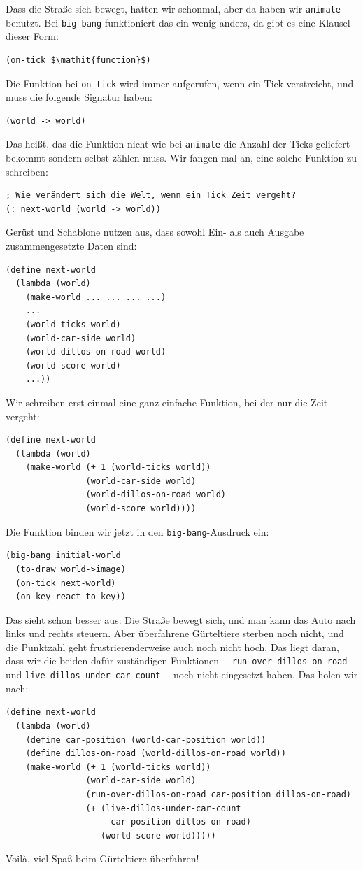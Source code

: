 Dass die Straße sich bewegt, hatten wir schonmal, aber da haben wir
\lstinline{animate} benutzt.  Bei \lstinline{big-bang} funktioniert
das ein wenig anders, da gibt es eine Klausel dieser Form:
%
\begin{lstlisting}
(on-tick $\mathit{function}$)
\end{lstlisting}
%
Die Funktion bei \lstinline{on-tick} wird immer aufgerufen, wenn ein
Tick verstreicht, und muss die folgende Signatur haben:
%
\begin{lstlisting}
(world -> world)
\end{lstlisting}
%
Das heißt, das die Funktion nicht wie bei \lstinline{animate} die
Anzahl der Ticks geliefert bekommt sondern selbst zählen muss.  Wir
fangen mal an, eine solche Funktion zu schreiben:
%
\begin{lstlisting}
; Wie verändert sich die Welt, wenn ein Tick Zeit vergeht?
(: next-world (world -> world))
\end{lstlisting}
%
Gerüst und Schablone nutzen aus, dass sowohl Ein- als auch Ausgabe
zusammengesetzte Daten sind:
%
\begin{lstlisting}
(define next-world
  (lambda (world)
    (make-world ... ... ... ...)
    ...
    (world-ticks world)
    (world-car-side world)
    (world-dillos-on-road world)
    (world-score world)
    ...))
\end{lstlisting}
%
Wir schreiben erst einmal eine ganz einfache Funktion, bei der nur die
Zeit vergeht:
%
\begin{lstlisting}
(define next-world
  (lambda (world)
    (make-world (+ 1 (world-ticks world))
                (world-car-side world)
                (world-dillos-on-road world)
                (world-score world))))
\end{lstlisting}
%
Die Funktion binden wir jetzt in den \lstinline{big-bang}-Ausdruck ein:
%
\begin{lstlisting}
(big-bang initial-world
  (to-draw world->image)
  (on-tick next-world)
  (on-key react-to-key))
\end{lstlisting}
%
Das sieht schon besser aus: Die Straße bewegt sich, und man kann das
Auto nach links und rechts steuern.  Aber überfahrene Gürteltiere
sterben noch nicht, und die Punktzahl geht frustrierenderweise auch
noch nicht hoch.  Das liegt daran, dass wir die beiden dafür zuständigen Funktionen~--
\lstinline{run-over-dillos-on-road} und
\lstinline{live-dillos-under-car-count}~-- noch nicht eingesetzt
haben.  Das holen wir nach:
%
\begin{lstlisting}
(define next-world
  (lambda (world)
    (define car-position (world-car-position world))
    (define dillos-on-road (world-dillos-on-road world))
    (make-world (+ 1 (world-ticks world))
                (world-car-side world)
                (run-over-dillos-on-road car-position dillos-on-road)
                (+ (live-dillos-under-car-count
                     car-position dillos-on-road)
                   (world-score world)))))
\end{lstlisting}
%
Voil\`a, viel Spaß beim Gürteltiere-überfahren!

